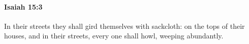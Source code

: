 
		\paragraph{Isaiah 15:3} %
			\label{ISAIAH-15-3}

			In their streets they shall gird themselves with sackcloth: on the tops of their houses, and in their streets, every one shall howl, weeping abundantly.


